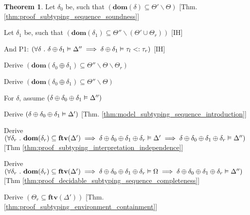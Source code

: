 \documentclass[acmsmall]{acmart}
\theoremstyle{definition}
\newtheorem{theorem}{Theorem}[section]
\begin{document}
\begin{theorem}
  \item \I \N Let $\delta_0$ be, such that $(
    \textbf{dom}(\delta) \subseteq \Theta' \backslash \Theta
  )$ [Thm. \ref{thm:proof_subtyping_sequence_soundness}]

  \item \I \N Let $\delta_1$ be, such that $(
    \textbf{dom}(\delta_1) \subseteq \Theta'' \backslash (\Theta' \cup \Theta_r)
  )$ [IH]

  \item \I \N And P1: $(
    \forall \delta \ .\ 
    \delta \oplus \delta_1 \vDash \Delta''
    \implies
    \delta \oplus \delta_1 \vDash \tau_l <: \tau_r
  )$ [IH]

  \item \I \N Derive $(
    \textbf{dom}(\delta_0 \oplus \delta_1) \subseteq \Theta'' \backslash \Theta \backslash \Theta_r
  )$

  \item \I \N Derive $(
    \textbf{dom}(\delta_0 \oplus \delta_1) \subseteq \Theta'' \backslash \Theta
  )$

  \item \I \N For $\delta$, assume $(
    \delta \oplus \delta_0 \oplus \delta_1 \vDash \Delta''
  )$ 

  \item \I\I \N Derive $(
    \delta \oplus \delta_0 \oplus \delta_1 \vDash \Delta'
  )$ [Thm. \ref{thm:model_subtyping_sequence_introduction}]

  \item \I\I \N Derive $(
    \forall \delta_r \ .\ 
    \textbf{dom}(\delta_r) \subseteq \textbf{ftv}(\Delta')
    \implies
    \delta \oplus \delta_0 \oplus \delta_1 \oplus \delta_r \vDash \Delta' 
    \implies
    \delta \oplus \delta_0 \oplus \delta_1 \oplus \delta_r \vDash \Delta''
  )$ [Thm \ref{thm:proof_subtyping_interpretation_independence}]


  \item \I\I \N Derive $(
    \forall \delta_r \ .\ 
    \textbf{dom}(\delta_r) \subseteq \textbf{ftv}(\Delta')
    \implies
    \delta \oplus \delta_0 \oplus \delta_1 \oplus \delta_r \vDash \Omega 
    \implies
    \delta \oplus \delta_0 \oplus \delta_1 \oplus \delta_r \vDash \Delta''
  )$ [Thm \ref{thm:proof_decidable_subtyping_sequence_completeness}]

  \item \I\I \N Derive $(
    \Theta_r \subseteq \textbf{ftv}(\Delta')
  )$ [Thm. \ref{thm:proof_subtyping_environment_containment}]


\end{theorem}
\end{document}
